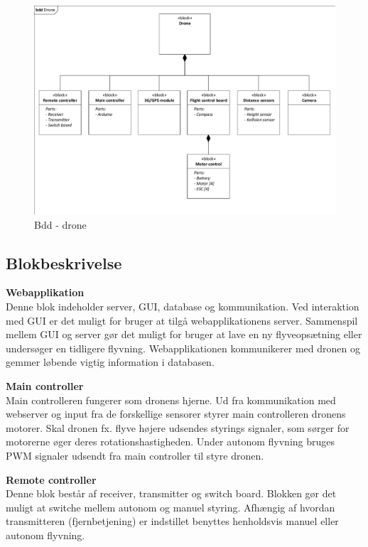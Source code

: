 \begin{figure}[H]
\centering
\includegraphics[width=1.\textwidth]{Billeder/BDD/bdd_drone.pdf}
\vspace{-0.5cm}
\caption{Bdd - drone}
\label{fig:bdd_drone}
\end{figure}

\newpage

\subsection{Blokbeskrivelse}

\textbf{Webapplikation}\\
Denne blok indeholder server, GUI, database og kommunikation. 
Ved interaktion med GUI er det muligt for bruger at tilgå webapplikationens server. Sammenspil mellem GUI og server gør det muligt for bruger at lave en ny flyveopsætning eller undersøger en tidligere flyvning. Webapplikationen kommunikerer med dronen og gemmer løbende vigtig information i databasen.

\textbf{Main controller}\\
Main controlleren fungerer som dronens hjerne. Ud fra kommunikation med webserver og input fra de forskellige sensorer styrer main controlleren dronens motorer. Skal dronen fx. flyve højere udsendes styrings signaler, som sørger for motorerne øger deres rotationshastigheden. Under autonom flyvning bruges PWM signaler udsendt fra main controller til styre dronen. 

\textbf{Remote controller}\\
Denne blok består af receiver, transmitter og switch board. Blokken gør det muligt at switche mellem autonom og manuel styring. Afhængig af hvordan transmitteren (fjernbetjening) er indstillet benyttes henholdsvis manuel eller autonom flyvning.

